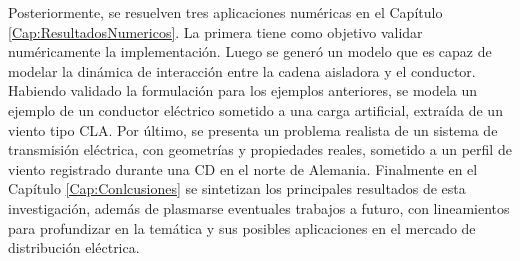 Posteriormente, se resuelven tres aplicaciones numéricas en el Capítulo \ref{Cap:ResultadosNumericos}. La primera tiene como objetivo validar numéricamente la implementación. Luego se generó un modelo que es capaz de modelar la dinámica de interacción entre la cadena aisladora y el conductor. Habiendo validado la formulación para los ejemplos anteriores, se modela un ejemplo de un conductor eléctrico sometido a una carga artificial, extraída de un viento tipo \gls{CLA}. Por último, se presenta un problema realista de un sistema de transmisión eléctrica, con geometrías y propiedades reales, sometido a un perfil de viento registrado durante una CD en el norte de Alemania. Finalmente en el Capítulo \ref{Cap:Conlcusiones} se sintetizan los principales resultados de esta investigación, además de plasmarse eventuales trabajos a futuro, con lineamientos para profundizar en la temática y sus posibles aplicaciones en el mercado de distribución eléctrica.  
